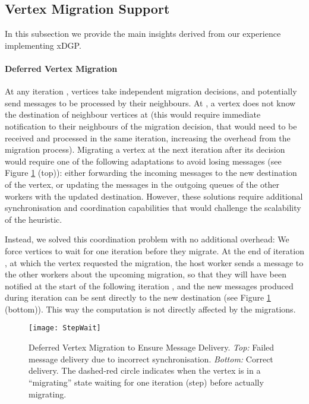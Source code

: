 \documentclass{sig-alternate-10pt}
\begin{document}
\subsection{Vertex Migration Support}

In this subsection we provide the main insights derived from our experience implementing xDGP.

\paragraph{\textbf{Deferred Vertex Migration}} At any iteration , vertices take independent migration decisions, and potentially send messages to be processed by their neighbours. At , a vertex does not know the destination of neighbour vertices at  (this would require immediate notification to their neighbours of the migration decision, that would need to be received and processed in the same iteration, increasing the overhead from the migration process). Migrating a vertex at the next iteration after its decision would require one of the following adaptations to avoid losing messages (see Figure \ref{fig:dance} (top)): either forwarding the incoming messages to the new destination of the vertex, or updating the messages in the outgoing queues of the other workers with the updated destination. However, these solutions require additional synchronisation and coordination capabilities that would challenge the scalability of the  heuristic.

Instead, we solved this coordination problem with no additional overhead: We force vertices to wait for one iteration before they migrate. At the end of iteration , at which the vertex requested the migration, the host  worker sends a message to the other workers about the upcoming migration, so that they will have been notified at the start of the following iteration , and the new messages produced during iteration  can be sent directly to the new destination (see Figure \ref{fig:dance} (bottom)). This way the computation is not directly affected by the migrations.

\begin{figure}
 \centering
    \texttt{[image: StepWait]}
 \caption{ Deferred Vertex Migration to Ensure Message Delivery. \textit{Top: } Failed message delivery due to incorrect synchronisation. \textit{Bottom: } Correct delivery. The dashed-red circle indicates when the vertex is in a ``migrating'' state waiting for one iteration (step) before actually migrating.}
 \label{fig:dance}
 \vspace{-10pt}
\end{figure}
\end{document}
